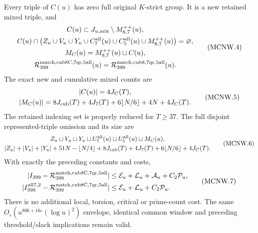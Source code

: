\begin{theorem}
\label{AC-G216-window}
Every triple of $C(u)$ has zero full original $K$-strict group.
It is a new retained mixed triple, and
\[
 \begin{gathered}
 C(u)\subset J_{u,\rm mix}\setminus M_{8,7}^{++}(u),\\
 C(u)\cap\bigl(Z_u\cup V_u\cup Y_u\cup C_7^{\rm all}(u)
          \cup C_5^{\rm all}(u)\cup M_{8,7}^{++}(u)\bigr)
                                                     =\varnothing,\\
 M_C(u)=M_{8,7}^{++}(u)\sqcup C(u),\\
 \mathcal R_{399}^{\rm match,cub8C,7qr,5all}(u)
                   =\mathcal R_{399}^{\rm match,cub8,7qr,5all}(u).
 \end{gathered}\tag{MCNW.4}
\]
The exact new and cumulative mixed counts are
\[
 \begin{gathered}
 |C(u)|=4J_C(T),\\
 |M_C(u)|=8J_{\rm cub}(T)+4J_7(T)+6\lfloor N/6\rfloor+4N+4J_C(T).
 \end{gathered}\tag{MCNW.5}
\]
The retained indexing set is properly reduced for $T\geq37$.
The full disjoint represented-triple omission and its size are
\[
 \begin{gathered}
 Z_u\sqcup V_u\sqcup Y_u\sqcup U_7^{\rm all}(u)
                    \sqcup U_5^{\rm all}(u)\sqcup M_C(u),\\
 |Z_u|+|V_u|+|Y_u|+51N-\lfloor N/4\rfloor
       +8J_{\rm cub}(T)+4J_7(T)+6\lfloor N/6\rfloor+4J_C(T).
 \end{gathered}\tag{MCNW.6}
\]
With exactly the preceding constants and costs,
\[
 \begin{aligned}
 |I_{399}-\mathcal R_{399}^{\rm match,cub8C,7qr,5all}|&\leq
        \mathcal E_u+\mathcal L_u+\mathcal A_u+C_2\mathcal P_u,\\
 |I_{399}^{\rm all7,2}-\mathcal R_{399}^{\rm match,cub8C,7qr,5all}|&\leq
        \mathcal E_u+\mathcal L_u+C_2\mathcal P_u.
 \end{aligned}\tag{MCNW.7}
\]
There is no additional local, torsion, critical or prime-count cost.
The same $O_\varepsilon(u^{806+16\varepsilon}(\log u)^2)$ envelope,
identical common window and preceding threshold/slack implications
remain valid.
\end{theorem}

